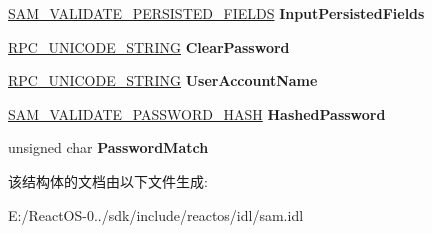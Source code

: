 \begin{DoxyCompactItemize}
\item 
\mbox{\label{struct___s_a_m___v_a_l_i_d_a_t_e___p_a_s_s_w_o_r_d___c_h_a_n_g_e___i_n_p_u_t___a_r_g_a0215fac647a16ff9be311d07c7581a28}} 
\hyperlink{struct___s_a_m___v_a_l_i_d_a_t_e___p_e_r_s_i_s_t_e_d___f_i_e_l_d_s}{S\+A\+M\+\_\+\+V\+A\+L\+I\+D\+A\+T\+E\+\_\+\+P\+E\+R\+S\+I\+S\+T\+E\+D\+\_\+\+F\+I\+E\+L\+DS} {\bfseries Input\+Persisted\+Fields}
\item 
\mbox{\label{struct___s_a_m___v_a_l_i_d_a_t_e___p_a_s_s_w_o_r_d___c_h_a_n_g_e___i_n_p_u_t___a_r_g_ad0a853b2ab6b68e8e798313a6a60b636}} 
\hyperlink{struct___r_p_c___u_n_i_c_o_d_e___s_t_r_i_n_g}{R\+P\+C\+\_\+\+U\+N\+I\+C\+O\+D\+E\+\_\+\+S\+T\+R\+I\+NG} {\bfseries Clear\+Password}
\item 
\mbox{\label{struct___s_a_m___v_a_l_i_d_a_t_e___p_a_s_s_w_o_r_d___c_h_a_n_g_e___i_n_p_u_t___a_r_g_a590fb3b5e5bf109da1f2d5d4dcada932}} 
\hyperlink{struct___r_p_c___u_n_i_c_o_d_e___s_t_r_i_n_g}{R\+P\+C\+\_\+\+U\+N\+I\+C\+O\+D\+E\+\_\+\+S\+T\+R\+I\+NG} {\bfseries User\+Account\+Name}
\item 
\mbox{\label{struct___s_a_m___v_a_l_i_d_a_t_e___p_a_s_s_w_o_r_d___c_h_a_n_g_e___i_n_p_u_t___a_r_g_adddf715443e4c1cd195f95bc16cf7b1d}} 
\hyperlink{struct___s_a_m___v_a_l_i_d_a_t_e___p_a_s_s_w_o_r_d___h_a_s_h}{S\+A\+M\+\_\+\+V\+A\+L\+I\+D\+A\+T\+E\+\_\+\+P\+A\+S\+S\+W\+O\+R\+D\+\_\+\+H\+A\+SH} {\bfseries Hashed\+Password}
\item 
\mbox{\label{struct___s_a_m___v_a_l_i_d_a_t_e___p_a_s_s_w_o_r_d___c_h_a_n_g_e___i_n_p_u_t___a_r_g_a177342e2df702b9046f4f25f4af07f81}} 
unsigned char {\bfseries Password\+Match}
\end{DoxyCompactItemize}


该结构体的文档由以下文件生成\+:\begin{DoxyCompactItemize}
\item 
E\+:/\+React\+O\+S-\/0../sdk/include/reactos/idl/sam.\+idl\end{DoxyCompactItemize}
